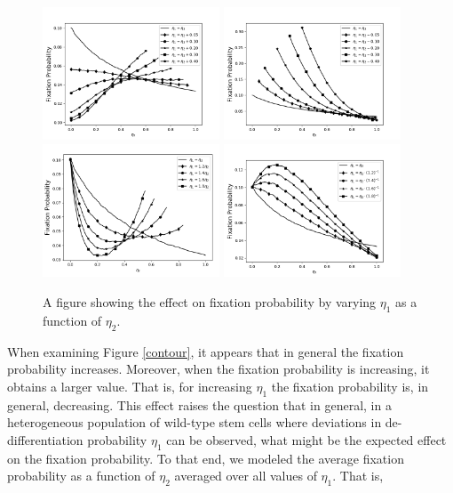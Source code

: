 \documentclass[12pt]{article}
\begin{document}
\begin{figure}[H]
\begin{center}
\includegraphics[width=0.47\textwidth]{eta_plus_const.png}
\includegraphics[width=0.47\textwidth]{eta_minus_const.png}\\
\includegraphics[width=0.47\textwidth]{eta_times_const.png}
\includegraphics[width=0.47\textwidth]{eta_div_const.png}
\end{center}
\caption{A figure showing the effect on fixation probability by varying $\eta_1$ as a function of $\eta_2$.}\label{eta_stack}
\end{figure}

When examining Figure \ref{contour}, it appears that in general the fixation probability increases. Moreover, when the fixation probability is increasing, it obtains a larger value. That is, for increasing $\eta_1$ the fixation probability is, in general, decreasing. This effect raises the question that in general, in a heterogeneous population of wild-type stem cells where deviations in de-differentiation probability $\eta_1$ can be observed, what might be the expected effect on the fixation probability. To that end, we modeled the average fixation probability as a function of $\eta_2$ averaged over all values of $\eta_1$. That is,
\end{document}
